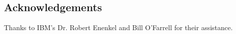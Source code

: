 \documentclass[a0,landscape,24pt]{a0poster}
\begin{document}
\begin{multicols}{3}
\color{DarkSlateGray} %



\nocite{*} %


\section*{Acknowledgements}

Thanks to IBM's Dr. Robert Enenkel and Bill O'Farrell for their assistance. 


\end{multicols}
\end{document}

